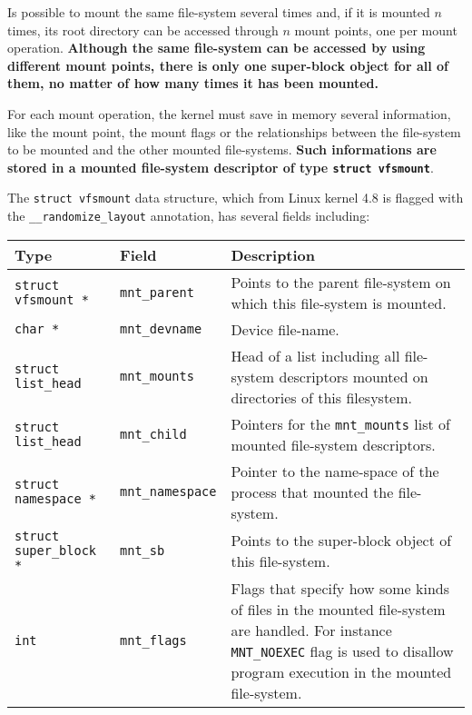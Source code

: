 \documentclass[10pt,a4paper]{article}
\begin{document}
Is possible to mount the same file-system several times and, if it is mounted $n$ times, its root directory can be accessed through $n$ mount points, one per mount operation. \textbf{Although the same file-system can be accessed by using different mount points, there is only one super-block object for all of them, no matter of how many times it has been mounted.}

For each mount operation, the kernel must save in memory several information, like the mount point, the mount flags or the relationships between the file-system to be mounted and the other mounted file-systems. \textbf{Such informations are stored in a mounted file-system descriptor of type \texttt{struct vfsmount}}.

The \texttt{struct vfsmount} data structure, which from Linux kernel 4.8 is flagged with the \texttt{\_\_randomize\_layout} annotation, has several fields including:

\begin{center}
\begin{tabular}{l|l|p{13cm}} 

\toprule
Type & Field & Description \\
\midrule

\texttt{struct vfsmount *} & \texttt{mnt\_parent} & Points to the parent file-system on which this file-system is mounted.\\
\texttt{char *} & \texttt{mnt\_devname} & Device file-name.\\
\texttt{struct list\_head} & \texttt{mnt\_mounts} & Head of a list including all file-system descriptors mounted on directories of this filesystem. \\
\texttt{struct list\_head} & \texttt{mnt\_child} & Pointers for the \texttt{mnt\_mounts} list of mounted file-system descriptors. \\
\texttt{struct namespace *} & \texttt{mnt\_namespace} & Pointer to the name-space of the process that mounted the file-system. \\
\texttt{struct super\_block *} & \texttt{mnt\_sb} & Points to the super-block object of this file-system.\\
\texttt{int} & \texttt{mnt\_flags} & Flags that specify how some kinds of files in the mounted file-system are handled. For instance \texttt{MNT\_NOEXEC} flag is used to disallow program execution in the mounted file-system.\\

\bottomrule
\end{tabular}
\end{center}
\end{document}
